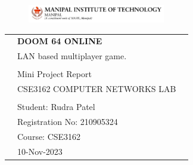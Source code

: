 \begin{center}

\vspace*{1cm}

\begin{figure}
  \raggedleft
  \begin{minipage}{4cm}
  \includegraphics[width=6cm]{images/mu.jpg}
  \end{minipage}
\end{figure}

\vspace*{2cm}

\vspace*{0.1in}

\begin{spacing}{1.7}

\begin{tabular}{p{4cm} ll}

& \textbf{\huge DOOM 64 ONLINE}\\ %
& \Large LAN based multiplayer game.\\ %
& \\
& \large Mini Project Report \\
& \large CSE3162 COMPUTER NETWORKS LAB \\

& \\
& \large Student: Rudra Patel \\
& \large Registration No: 210905324\\
& \large Course: CSE3162 \\
& \large 10-Nov-2023 
\end{tabular}

\end{spacing}

\end{center}



\thispagestyle{empty} %
\clearpage\setcounter{page}{1} %
